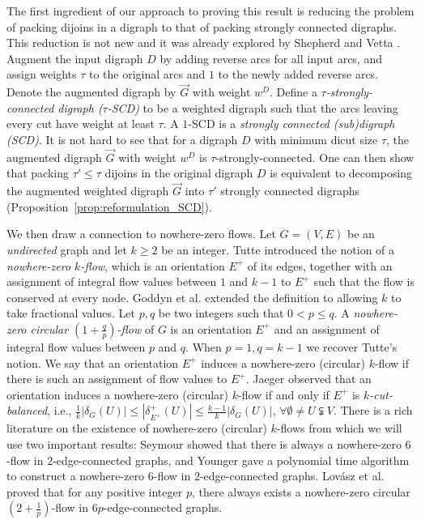 \documentclass[runningheads]{llncs}
\begin{document}
The first ingredient of our approach to proving this result is reducing the problem of packing dijoins in a digraph to that of packing strongly connected digraphs. This reduction is not new and it was already explored by Shepherd and Vetta \cite{shepherd2005visualizing}. 
Augment the input digraph $D$ by adding reverse arcs for all input arcs, and assign weights $\tau$ to the original arcs and $1$ to the newly added reverse arcs. Denote the augmented digraph by $\vec{G}$ with weight $w^D$. Define a \textit{$\tau$-strongly-connected digraph ($\tau$-SCD)} to be a weighted digraph such that the arcs leaving every cut have weight at least $\tau$. A $1$-SCD is a \textit{strongly connected (sub)digraph (SCD)}. It is not hard to see that for a digraph $D$ with minimum dicut size $\tau$, the augmented digraph $\vec{G}$ with weight $w^D$ is $\tau$-strongly-connected. One can then show that packing $\tau' \leq \tau$ dijoins in the original digraph $D$ is equivalent to decomposing the augmented weighted digraph $\vec{G}$ into $\tau'$ strongly connected digraphs (Proposition~\ref{prop:reformulation_SCD}).

We then draw a connection to nowhere-zero flows. Let $G=(V,E)$ be an {\em undirected} graph and let $k \geq 2$ be an integer. Tutte \cite{tutte1954contribution} introduced the notion of a \textit{nowhere-zero $k$-flow}, which is an orientation $E^+$ of its edges, together with an 
assignment of integral flow values between $1$ and $k-1$ to $E^+$ such that the flow is conserved at every node. Goddyn et al. 
\cite{goddyn1998k} extended the definition to allowing $k$ to take fractional values. Let $p,q$ be two integers such that $0<p\leq q$. A \textit{nowhere-zero circular $(1+\frac{q}{p})$-flow} of $G$ is an orientation $E^+$ and an assignment of integral flow values between $p$ and $q$. When $p = 1, q=k-1$ we recover Tutte's notion. We say that an orientation $E^+$ induces a nowhere-zero (circular) $k$-flow if there is such an assignment of flow values to $E^+$. Jaeger \cite{jaeger1976balanced} observed that an orientation induces a nowhere-zero (circular) $k$-flow if and only if $E^+$ is \textit{$k$-cut-balanced}, i.e., $\frac{1}{k}|\delta_{G}(U)|\leq |\delta^+_{E^+}(U)|\leq \frac{k-1}{k}|\delta_{G}(U)|$, $\forall \emptyset \neq U\subsetneqq V$. There is a rich literature on the existence of nowhere-zero (circular) $k$-flows from which we will use two important results: 
Seymour \cite{seymour1981nowhere} showed that there is always a nowhere-zero $6$-flow in $2$-edge-connected graphs, and Younger \cite{younger1983integer} gave a polynomial time algorithm to construct a nowhere-zero $6$-flow in $2$-edge-connected graphs.
Lov\'asz et al. \cite{lovasz2013nowhere} proved that for any positive integer $p$, there always exists a nowhere-zero circular $(2+\frac{1}{p})$-flow in $6p$-edge-connected graphs.
\end{document}
